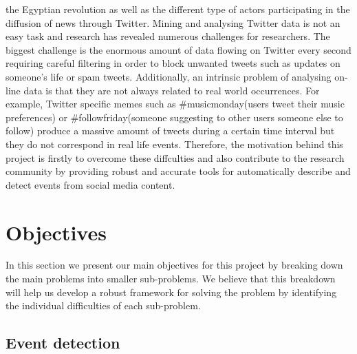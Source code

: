 the Egyptian revolution as well as the different type of actors participating in the diffusion of news through Twitter.
Mining and analysing Twitter data is not an easy task and research has revealed numerous challenges for researchers.
The biggest challenge is the enormous amount of data flowing on Twitter every second requiring careful filtering in
order to block unwanted tweets such as updates on someone's life or spam tweets. Additionally, an intrinsic problem
of analysing on-line data is that they are not always related to real world occurrences. For example, Twitter specific
memes such as \#musicmonday(users tweet their music preferences) or \#followfriday(someone suggesting to other
users someone else to follow) produce a massive amount of tweets during a certain time interval but they do not
correspond in real life events.
Therefore, the motivation behind this project is firstly to overcome these diffculties and also contribute to the
research community by providing robust and accurate tools for automatically describe and detect events from social media
content. 

\section{Objectives}	
In this section we present our main objectives for this project by breaking down the main problems into smaller sub-problems. We believe that this breakdown will help us develop a robust framework for solving the problem by identifying the individual difficulties of each sub-problem.  	

\subsection{Event detection }\label{sec:EventDetection}

